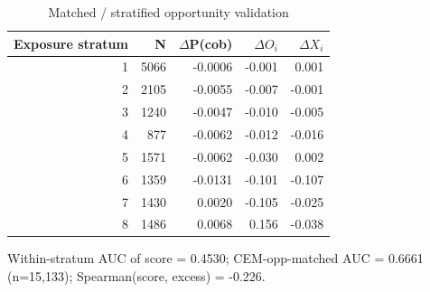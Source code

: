 \begin{table}[htbp]\centering
\caption{Matched / stratified opportunity validation}
\label{tab:opp_matched}
\begin{tabular}{rrrrr}\hline
Exposure stratum & N & $\Delta$P(cob) & $\Delta O_i$ & $\Delta X_i$ \\\hline
1 & 5066 & -0.0006 & -0.001 & 0.001 \\
2 & 2105 & -0.0055 & -0.007 & -0.001 \\
3 & 1240 & -0.0047 & -0.010 & -0.005 \\
4 & 877 & -0.0062 & -0.012 & -0.016 \\
5 & 1571 & -0.0062 & -0.030 & 0.002 \\
6 & 1359 & -0.0131 & -0.101 & -0.107 \\
7 & 1430 & 0.0020 & -0.105 & -0.025 \\
8 & 1486 & 0.0068 & 0.156 & -0.038 \\
\hline\end{tabular}
\begin{tablenotes}\footnotesize\item Within-stratum AUC of score = 0.4530; CEM-opp-matched AUC = 0.6661 (n=15,133); Spearman(score, excess) = -0.226.\end{tablenotes}
\end{table}

